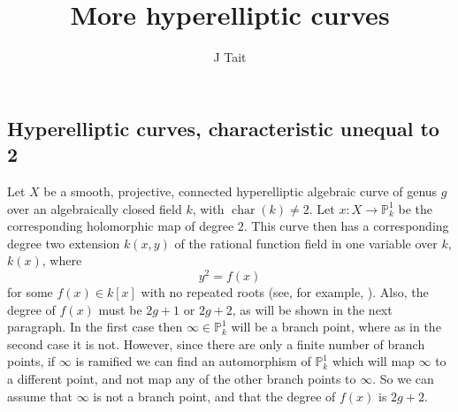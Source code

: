 \documentclass[11pt]{article} %
\title{More hyperelliptic curves}
\author{J Tait}
\theoremstyle{plain}
\theoremstyle{remark}
\DeclareMathOperator{\cha}{char}
\begin{document}
\maketitle

  \subsection{Hyperelliptic curves, characteristic unequal to 2}\label{charneq2}
  Let $X$ be a smooth, projective, connected hyperelliptic algebraic curve of genus $g$ over an algebraically closed field $k$, with $\cha (k) \neq 2$.
Let $x:X\rightarrow \mathbb{P}_k^1$ be the corresponding holomorphic map of degree $2$.
This curve then has a corresponding degree two extension $k(x,y)$ of the rational function field in one variable over $k$, $k(x)$, where
\begin{equation}\label{definingequation}
 y^2 = f(x)
\end{equation}
for some $f(x)\in k[x]$ with no repeated roots (see, for example, \cite[7.4.3]{liu}).
Also, the degree of $f(x)$ must be $2g+1$ or $2g+2$, as will be shown in the next paragraph.
In the first case then $\infty \in \mathbb P_k^1$ will be a branch point, where as in the second case it is not.
However, since there are only a finite number of branch points, if $\infty$ is ramified we can find an automorphism of $\mathbb P_k^1$ which will map $\infty$ to a different point, and not map any of the other branch points to $\infty$.
So we can assume that $\infty$ is not a branch point, and that the degree of $f(x)$ is $2g+2$.
\end{document}
